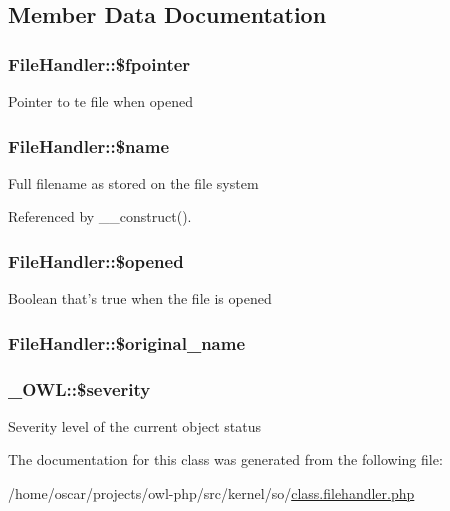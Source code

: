 \subsection{Member Data Documentation}
\subsubsection[{\$fpointer}]{\setlength{\rightskip}{0pt plus 5cm}FileHandler::\$fpointer}\label{classFileHandler_aa0aa66fd3ad551b3f508b901a95c0c2d}
Pointer to te file when opened 
\subsubsection[{\$name}]{\setlength{\rightskip}{0pt plus 5cm}FileHandler::\$name}\label{classFileHandler_a94903bd51b241928ed415ad271c38805}
Full filename as stored on the file system 

Referenced by \_\-\_\-construct().

\subsubsection[{\$opened}]{\setlength{\rightskip}{0pt plus 5cm}FileHandler::\$opened}\label{classFileHandler_a061409b2bbd2e13bc47415527c0de720}
Boolean that's true when the file is opened 
\subsubsection[{\$original\_\-name}]{\setlength{\rightskip}{0pt plus 5cm}FileHandler::\$original\_\-name}\label{classFileHandler_a477708585850c3c8725ccf56bfe0b4a8}
\subsubsection[{\$severity}]{\setlength{\rightskip}{0pt plus 5cm}\_\-OWL::\$severity}\label{class__OWL_ad26b40a9dbbacb33e299b17826f8327c}
Severity level of the current object status 

The documentation for this class was generated from the following file:\begin{DoxyCompactItemize}
\item 
/home/oscar/projects/owl-\/php/src/kernel/so/\hyperlink{class_8filehandler_8php}{class.filehandler.php}\end{DoxyCompactItemize}
